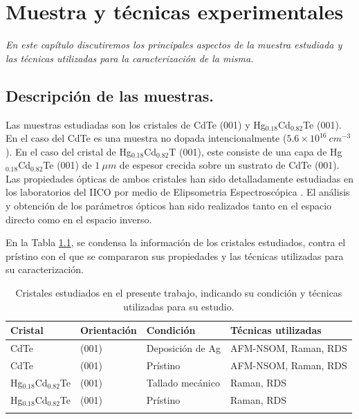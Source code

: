 \chapter{Muestra y técnicas experimentales}
\label{chap:techniques-and-sample}
\textit{En este capítulo discutiremos los principales aspectos de la muestra estudiada y las técnicas utilizadas para la 
caracterización de la misma.}
\vfill
\minitoc
\newpage

\section{Descripción de las muestras.}
\label{sec:chap3-sample-description}
Las muestras estudiadas son los cristales de CdTe (001) y Hg$_{0.18}$Cd$_{0.82}$Te (001). En el caso del CdTe es una muestra no dopada intencionalmente ($ 5.6\times10^{16}\ cm^{-3} $). En el caso del cristal de Hg$_{0.18}$Cd$_{0.82}$T (001), este consiste de una capa de Hg$_{0.18}$Cd$_{0.82}$Te (001) de $ 1\ \mu m $ de espesor crecida sobre un sustrato de CdTe (001). Las propiedades ópticas de ambos cristales han sido detalladamente estudiadas en los laboratorios del IICO por medio de Elipsometria Espectroscópica \cite{Camacho2005, LastrasMartnez2009}. El análisis y obtención de los parámetros ópticos han sido realizados tanto en el espacio directo como en el espacio inverso\cite{Camacho2005, LastrasMartnez2009}.

En la Tabla \ref{tab:crystal_description}, se condensa la información de los cristales estudiados, contra el prístino con el que se compararon sus propiedades y las técnicas utilizadas para su caracterización.

\begin{table}[h!]
    \centering
        \begin{tabular}{m{7em} m{5em} m{8em} m{12em}}
        \hline \hline
        Cristal 		            & Orientación   & Condición         & Técnicas utilizadas\\
        \hline
        CdTe                        & (001)         & Deposición de Ag 	& AFM-NSOM, Raman, RDS\\
        CdTe                        & (001)         & Prístino          & AFM-NSOM, Raman, RDS\\
        Hg$_{0.18}$Cd$_{0.82}$Te    & (001)         & Tallado mecánico  & Raman, RDS\\
        Hg$_{0.18}$Cd$_{0.82}$Te    & (001)         & Prístino          & Raman, RDS\\
        \hline \hline
        \caption{Cristales estudiados en el presente trabajo, indicando su condición y técnicas utilizadas para su estudio.}
    \label{tab:crystal_description}
    \end{tabular}
\end{table}

